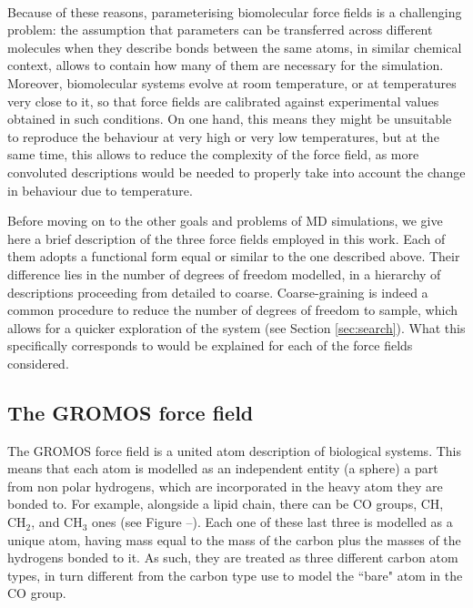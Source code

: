 \paragraph{} Because of these reasons, parameterising biomolecular force fields is a challenging problem: the assumption that parameters can be transferred across different molecules when they describe bonds between the same atoms, in similar chemical context, allows to contain how many of them are necessary for the simulation.
%
Moreover, biomolecular systems evolve at room temperature, or at temperatures very close to it, so that force fields are calibrated against experimental values obtained in such conditions. On one hand, this means they might be unsuitable to reproduce the behaviour at very high or very low temperatures, but at the same time, this allows to reduce the complexity of the force field, as more convoluted descriptions would be needed to properly take into account the change in behaviour due to temperature.

Before moving on to the other goals and problems of MD simulations, we give here a brief description of the three force fields employed in this work. Each of them adopts a functional form equal or similar to the one described above. Their difference lies in the number of degrees of freedom modelled, in a hierarchy of descriptions proceeding from detailed to coarse. Coarse-graining is indeed a common procedure to reduce the number of degrees of freedom to sample, which allows for a quicker exploration of the system (see Section \ref{sec:search}). What this specifically corresponds to would be explained for each of the force fields considered.

\subsection{The GROMOS force field}
The GROMOS force field is a united atom description of biological systems. This means that each atom is modelled as an independent entity (a sphere) a part from non polar hydrogens, which are incorporated in the heavy atom they are bonded to. For example, alongside a lipid chain, there can be CO groups, CH, CH$_2$, and CH$_3$ ones (see Figure --). Each one of these last three is modelled as a unique atom, having mass equal to the mass of the carbon plus the masses of the hydrogens bonded to it. As such, they are treated as three different carbon atom types, in turn different from the carbon type use to model the ``bare" atom in the CO group.


